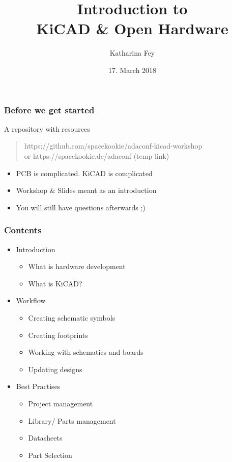 \documentclass{beamer}
\begin{document}
\title{Introduction to\\KiCAD \& Open Hardware}
\author{Katharina Fey}
\date{17. March 2018}

\frame{\titlepage}


\begin{frame}
  \frametitle{Before we get started}

  A repository with resources

  \begin{quote}
    https://github.com/spacekookie/adaconf-kicad-workshop\\
    or https://spacekookie.de/adaconf (temp link)\\
  \end{quote}
  
  \begin{itemize}
    \item PCB is complicated. KiCAD is complicated
    \item Workshop \& Slides meant as an introduction
    \item You will still have questions afterwards ;)
  \end{itemize}
\end{frame}



\begin{frame}
  \frametitle{Contents}
  \begin{itemize}
    \item Introduction
    \begin{itemize}
      \item What is hardware development
      \item What is KiCAD?
    \end{itemize}
    \item Workflow
    \begin{itemize}
      \item Creating schematic symbols
      \item Creating footprints
      \item Working with schematics and boards
      \item Updating designs
    \end{itemize}
    \item Best Practises
    \begin{itemize}
      \item Project management
      \item Library/ Parts management
      \item Datasheets
      \item Part Selection
    \end{itemize}
  \end{itemize}
\end{frame}
\end{document}
